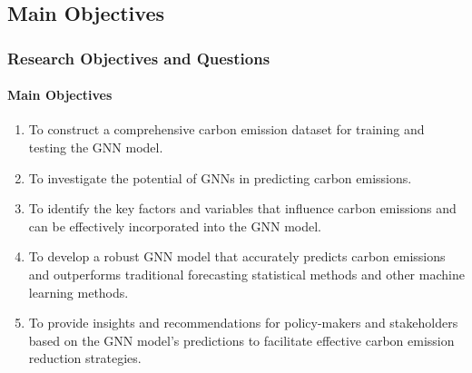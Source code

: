 \documentclass[light]{lutbeamer} %
\begin{document}
\subsection{Main Objectives}
\begin{frame}
    \frametitle{Research Objectives and Questions}
    \framesubtitle{Main Objectives}
    \begin{enumerate}
        \item To construct a comprehensive carbon emission dataset for training and testing the GNN model.
        \item To investigate the potential of GNNs in predicting carbon emissions.
        \item To identify the key factors and variables that influence carbon emissions and can be effectively incorporated into the GNN model.
        \item To develop a robust GNN model that accurately predicts carbon emissions and outperforms traditional forecasting statistical methods and other machine learning methods.
        \item To provide insights and recommendations for policy-makers and stakeholders based on the GNN model's predictions to facilitate effective carbon emission reduction strategies.
    \end{enumerate}
\end{frame}
\end{document}
